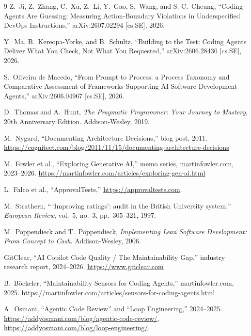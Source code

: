 \documentclass[11pt]{article}
\begin{document}
\begin{thebibliography}{9}
Z.~Ji, Z.~Zhang, C.~Xu, Z.~Li, Y.~Gao, S.~Wang, and S.-C.~Cheung,
``Coding Agents Are Guessing: Measuring Action-Boundary Violations in
Underspecified DevOps Instructions,'' arXiv:2607.02294 [cs.SE], 2026.

Y.~Ma, B.~Kereopa-Yorke, and B.~Schultz,
``Building to the Test: Coding Agents Deliver What You Check, Not What You
Requested,'' arXiv:2606.28430 [cs.SE], 2026.

S.~Oliveira de Macedo,
``From Prompt to Process: a Process Taxonomy and Comparative Assessment of
Frameworks Supporting AI Software Development Agents,''
arXiv:2606.04967 [cs.SE], 2026.

D.~Thomas and A.~Hunt,
\emph{The Pragmatic Programmer: Your Journey to Mastery}, 20th Anniversary
Edition. Addison-Wesley, 2019.

M.~Nygard, ``Documenting Architecture Decisions,'' blog post, 2011.
\url{https://cognitect.com/blog/2011/11/15/documenting-architecture-decisions}

M.~Fowler et al., ``Exploring Generative AI,'' memo series,
martinfowler.com, 2023--2026.
\url{https://martinfowler.com/articles/exploring-gen-ai.html}

L.~Falco et al., ``ApprovalTests,'' \url{https://approvaltests.com}.

M.~Strathern, ``\,`Improving ratings': audit in the British University
system,'' \emph{European Review}, vol.~5, no.~3, pp.~305--321, 1997.

M.~Poppendieck and T.~Poppendieck, \emph{Implementing Lean Software
Development: From Concept to Cash}. Addison-Wesley, 2006.

GitClear, ``AI Copilot Code Quality / The Maintainability Gap,'' industry
research report, 2024--2026. \url{https://www.gitclear.com}

B.~B\"ockeler, ``Maintainability Sensors for Coding Agents,''
martinfowler.com, 2025.
\url{https://martinfowler.com/articles/sensors-for-coding-agents.html}

A.~Osmani, ``Agentic Code Review'' and ``Loop Engineering,'' 2024--2025.
\url{https://addyosmani.com/blog/agentic-code-review/},
\url{https://addyosmani.com/blog/loop-engineering/}.


\end{thebibliography}
\end{document}
